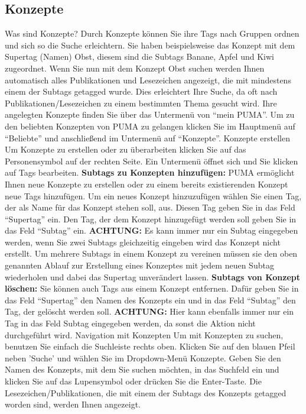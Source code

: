 \documentclass[a4paper,11pt,twoside]{scrbook}
\begin{document}
\subsection{Konzepte}
Was sind Konzepte?
\newline
Durch Konzepte können Sie ihre Tags nach Gruppen ordnen und sich so die Suche erleichtern. Sie haben beispielsweise das Konzept mit dem Supertag (Namen) Obst, diesem sind die Subtags Banane, Apfel und Kiwi zugeordnet. Wenn Sie nun mit dem Konzept Obst suchen werden Ihnen automatisch alles Publikationen und Lesezeichen angezeigt, die mit mindestens einem der Subtags getagged wurde. Dies erleichtert Ihre Suche, da oft nach Publikationen/Lesezeichen zu einem bestimmten Thema gesucht wird. 
\newline Ihre angelegten Konzepte finden Sie über das Untermenü von \enquote{mein PUMA}. Um zu den beliebten Konzepten von PUMA zu gelangen klicken Sie im Hauptmenü auf \enquote{Beliebte} und anschließend im Untermenü auf \enquote{Konzepte}. 
\newline
\newline
Konzepte erstellen
\newline
Um Konzepte zu erstellen oder zu überarbeiten klicken Sie auf das Personensymbol auf der rechten Seite. Ein Untermenü öffnet sich und Sie klicken auf Tags bearbeiten. 
\newline
\newline %
\textbf{Subtags zu Konzepten hinzufügen:} PUMA ermöglicht Ihnen neue Konzepte zu erstellen oder zu einem bereits existierenden Konzept neue Tags hinzufügen. Um ein neues Konzept hinzuzufügen wählen Sie einen Tag, der als Name für das Konzept stehen soll, aus. Diesen Tag geben Sie in das Feld \enquote{Supertag} ein. Den Tag, der dem Konzept hinzugefügt werden soll geben Sie in das Feld \enquote{Subtag} ein.
\textbf{ACHTUNG:} Es kann immer nur ein Subtag eingegeben werden, wenn Sie zwei Subtags gleichzeitig eingeben wird das Konzept nicht erstellt. Um mehrere Subtags in einem Konzept zu vereinen müssen sie den oben genannten Ablauf zur Erstellung eines Konzeptes mit jedem neuen Subtag wiederholen und dabei das Supertag unverändert lassen. 
\newline
\newline
\textbf{Subtags von Konzept löschen:} Sie können auch Tags aus einem Konzept entfernen. Dafür geben Sie in das Feld \enquote{Supertag} den Namen des Konzepts ein und in das Feld \enquote{Subtag} den Tag, der gelöscht werden soll. \textbf{ACHTUNG:} Hier kann ebenfalls immer nur ein Tag in das Feld Subtag eingegeben werden, da sonst die Aktion nicht durchgeführt wird.
\newline
\newline
Navigation mit Konzepten
\newline
Um mit Konzepten zu suchen, benutzen Sie einfach die Suchleiste rechts oben. Klicken Sie auf den blauen Pfeil neben 'Suche' und wählen Sie im Dropdown-Menü Konzepte. Geben Sie den Namen des Konzepts, mit dem Sie suchen möchten, in das Suchfeld ein und klicken Sie auf das Lupensymbol oder drücken Sie die Enter-Taste. Die Lesezeichen/Publikationen, die mit einem der Subtags des Konzepts getagged worden sind, werden Ihnen angezeigt. 
\end{document}
